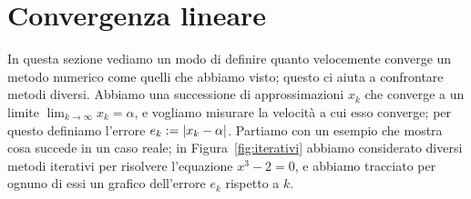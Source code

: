 \documentclass[a4paper]{report}
\DeclarePairedDelimiter{\abs}{\lvert}{\rvert}
\theoremstyle{definition}
\theoremstyle{remark}
\begin{document}
\section{Convergenza lineare}

In questa sezione vediamo un modo di definire quanto velocemente converge un metodo numerico come quelli che abbiamo visto; questo ci aiuta a confrontare metodi diversi. Abbiamo una successione di approssimazioni $x_k$ che converge a un limite $\lim_{k\to \infty} x_k=\alpha$, e vogliamo misurare la velocità a cui esso converge; per questo definiamo l'errore $e_k := \abs{x_k - \alpha}$. Partiamo con un esempio che mostra cosa succede in un caso reale; in Figura~\ref{fig:iterativi} abbiamo considerato diversi metodi iterativi per risolvere l'equazione $x^3-2 = 0$, e abbiamo tracciato per ognuno di essi un grafico dell'errore $e_k$ rispetto a $k$.
\end{document}
